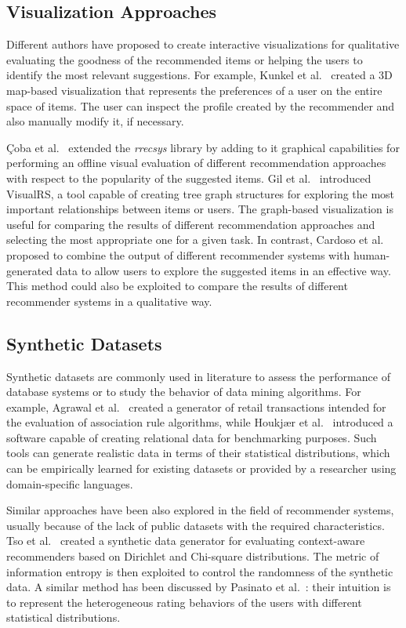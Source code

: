 \subsection{Visualization Approaches}

Different authors have proposed to create interactive visualizations for qualitative evaluating the goodness of the recommended items or helping the users to identify the most relevant suggestions. For example, Kunkel et al.~\cite{Kunkel2017} created a 3D map-based visualization that represents the preferences of a user on the entire space of items. The user can inspect the profile created by the recommender and also manually modify it, if necessary.

\c{C}oba et al.~\cite{Coba2017} extended the \textit{rrecsys} library by adding to it graphical capabilities for performing an offline visual evaluation of different recommendation approaches with respect to the popularity of the suggested items. Gil et al.~\cite{Gil2018} introduced VisualRS, a tool capable of creating tree graph structures for exploring the most important relationships between items or users. The graph-based visualization is useful for comparing the results of different recommendation approaches and selecting the most appropriate one for a given task. In contrast, Cardoso et al.~\cite{Cardoso2019} proposed to combine the output of different recommender systems with human-generated data to allow users to explore the suggested items in an effective way. This method could also be exploited to compare the results of different recommender systems in a qualitative way.

\subsection{Synthetic Datasets}

Synthetic datasets are commonly used in literature to assess the performance of database systems or to study the behavior of data mining algorithms. For example, Agrawal et al.~\cite{Agrawal1994} created a generator of retail transactions intended for the evaluation of association rule algorithms, while Houkj{\ae}r et al.~\cite{Houkjaer2006} introduced a software capable of creating relational data for benchmarking purposes. Such tools can generate realistic data in terms of their statistical distributions, which can be empirically learned for existing datasets or provided by a researcher using domain-specific languages.

Similar approaches have been also explored in the field of recommender systems, usually because of the lack of public datasets with the required characteristics. Tso et al.~\cite{Tso2006} created a synthetic data generator for evaluating context-aware recommenders based on Dirichlet and Chi-square distributions. The metric of information entropy is then exploited to control the randomness of the synthetic data. A similar method has been discussed by Pasinato et al.~\cite{Pasinato2013}: their intuition is to represent the heterogeneous rating behaviors of the users with different statistical distributions.

